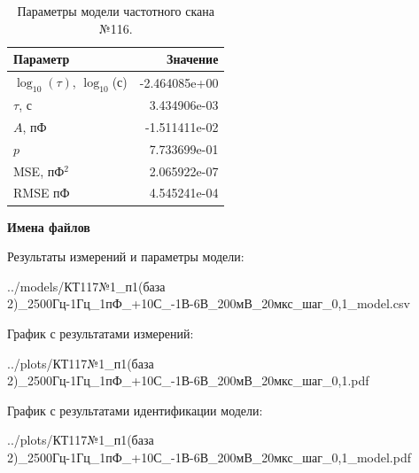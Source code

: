 \begin{table}[!ht]
    \centering
    \caption{Параметры модели частотного скана №116.}
    \begin{tabular}{|l|r|}
        \hline
        Параметр                                       & Значение                  \\ \hline
        $\log_{10}(\tau)$, $\log_{10}$(с)              & -2.464085e+00             \\ \hline
        $\tau$, с                                      & 3.434906e-03              \\ \hline
        $A$, пФ                                        & -1.511411e-02             \\ \hline
        $p$                                            & 7.733699e-01              \\ \hline
        MSE, пФ$^2$                                    & 2.065922e-07              \\ \hline
        RMSE пФ                                        & 4.545241e-04              \\ \hline
    \end{tabular}
    \label{table:frequency_scan_model_116}
\end{table}

\textbf{Имена файлов}

Результаты измерений и параметры модели:

\scriptsize../models/КТ117№1\_п1(база 2)\_2500Гц-1Гц\_1пФ\_+10С\_-1В-6В\_200мВ\_20мкс\_шаг\_0,1\_model.csv
\normalsize

График с результатами измерений:

\scriptsize../plots/КТ117№1\_п1(база 2)\_2500Гц-1Гц\_1пФ\_+10С\_-1В-6В\_200мВ\_20мкс\_шаг\_0,1.pdf
\normalsize

График с результатами идентификации модели:

\scriptsize../plots/КТ117№1\_п1(база 2)\_2500Гц-1Гц\_1пФ\_+10С\_-1В-6В\_200мВ\_20мкс\_шаг\_0,1\_model.pdf
\normalsize

